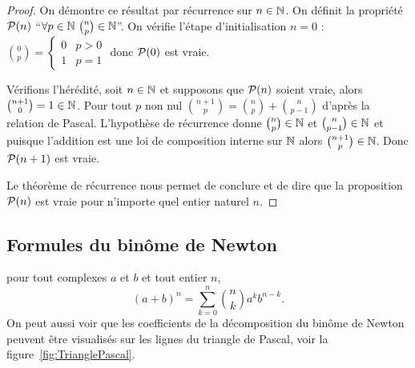 \begin{proof}
  On démontre ce résultat par récurrence sur \(n\in\N\). On définit la propriété 
  \(\P(n)\) ``\(\forall p \in \N \ \binom{n}{p}\in\N\)''. On vérifie l'étape 
  d'initialisation \(n = 0\) : \(\binom{0}{p} = \begin{cases} 0 & p>0 \\ 1 & 
  p = 1\end{cases}\) donc \(\P(0)\) est vraie. 

  Vérifions l'hérédité, soit \(n \in \N\) et supposons que \(\P(n)\) soient 
  vraie, alors \(\binom{n + 1}{0}=1\in \N\). Pour tout \(p\) non nul 
  \(\binom{n + 1}{p}=\binom{n}{p}+\binom{n}{p - 1}\) d'après la relation de Pascal.  
  L'hypothèse de récurrence donne \(\binom{n}{p}\in\N\) et 
  \(\binom{n}{p - 1}\in\N\) et puisque l'addition est une loi de composition 
  interne sur \(\N\) alors \(\binom{n + 1}{p}\in\N\). Donc \(\P(n + 1)\) est vraie. 

  Le théorème de récurrence nous permet de conclure et de dire que la 
  proposition \(\P(n)\) est vraie pour n'importe quel entier naturel \(n\).
\end{proof}

\subsection{Formules du binôme de Newton}

\begin{prop}
  pour tout complexes \(a\) et \(b\) et tout entier \(n\),
  \begin{equation}
    (a + b)^n = \sum_{k = 0}^n \binom{n}{k}a^kb^{n - k}.
  \end{equation}
  On peut aussi voir que les coefficients de la décomposition du binôme de 
  Newton peuvent être visualisés sur les lignes du triangle de Pascal, voir la 
  figure~\ref{fig:TrianglePascal}.
\end{prop}

